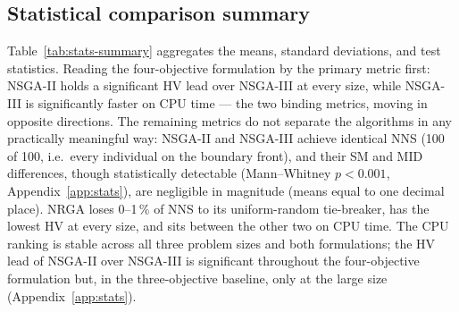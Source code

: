 \documentclass[applsci,article,submit,moreauthors,pdftex]{Definitions/mdpi}
\begin{document}
\subsection{Statistical comparison summary}\label{sec:perf-stats}

Table~\ref{tab:stats-summary} aggregates the means, standard deviations, and
test statistics. Reading the four-objective formulation by the primary metric
first: NSGA-II holds a significant HV lead over NSGA-III at every size, while
NSGA-III is significantly faster on CPU time --- the two binding metrics, moving
in opposite directions. The remaining metrics do not separate the algorithms in
any practically meaningful way: NSGA-II and NSGA-III achieve identical NNS
(100 of 100, i.e.\ every individual on the boundary front), and their SM and MID
differences, though statistically detectable (Mann--Whitney $p < 0.001$,
Appendix~\ref{app:stats}), are negligible in magnitude (means equal to one
decimal place). NRGA loses 0--1\,\% of NNS to its uniform-random
tie-breaker, has the lowest HV at every size, and sits between the other
two on CPU time. The CPU ranking is stable across all three problem sizes and
both formulations; the HV lead of NSGA-II over NSGA-III is significant
throughout the four-objective formulation but, in the three-objective baseline,
only at the large size (Appendix~\ref{app:stats}).
\end{document}
